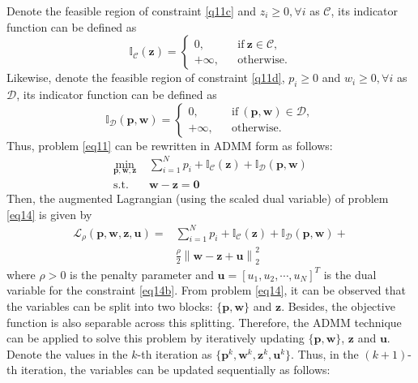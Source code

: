 \documentclass[journal]{IEEEtran}
\begin{document}
\begin{IEEEkeywords}
Denote the feasible region of constraint \eqref{q11c} and $z_i \geq 0, \forall i$ as $\mathcal{C}$, its indicator function can be defined as
\begin{equation}
\mathbb{I}_\mathcal{C}\left(\mathbf{z}\right) = \left\{ \begin{array}{lcl}
0, & &\mbox{if} \ \mathbf{z} \in \mathcal{C}, \\
+\infty, & &\mbox{otherwise}.
\end{array}
\right.
\end{equation}
Likewise, denote the feasible region of constraint \eqref{q11d}, $p_i\geq 0$ and $w_i \geq 0, \forall i$ as $\mathcal{D}$, its indicator function can be defined as
\begin{equation}
\mathbb{I}_\mathcal{D}\left(\mathbf{p},\mathbf{w}\right) = \left\{ \begin{array}{lcl}
0, & &\mbox{if} \ \left(\mathbf{p}, \mathbf{w}\right) \in \mathcal{D}, \\
+\infty, & &\mbox{otherwise}.
\end{array}
\right.
\end{equation}
Thus, problem \eqref{eq11} can be rewritten in ADMM form as follows:
\begin{subequations}\label{eq14}
	\begin{align}
	\min_{\mathbf{p}, \mathbf{w}, \mathbf{z}}\ & \sum\limits_{i = 1}^{N} p_i + \mathbb{I}_\mathcal{C}\left(\mathbf{z}\right) + \mathbb{I}_\mathcal{D}\left(\mathbf{p},\mathbf{w}\right)  \label{q14a} \\ \mbox{s.t.} \quad &  \mathbf{w} - \mathbf{z} = \mathbf{0} \label{q14b}
	\end{align}
\end{subequations}
Then, the augmented Lagrangian (using the scaled dual variable) of problem \eqref{eq14} is given by
\begin{align}
\mathcal{L}_\rho\left(\mathbf{p},\mathbf{w}, \mathbf{z},\mathbf{u}\right) = & \sum\limits_{i = 1}^{N} p_i + \mathbb{I}_\mathcal{C}\left(\mathbf{z}\right) + \mathbb{I}_\mathcal{D}\left(\mathbf{p},\mathbf{w}\right) +\nonumber \\ & \frac{\rho}{2}\left\|\mathbf{w} - \mathbf{z} + \mathbf{u}\right\|_2^2
\end{align}
where $\rho > 0$ is the penalty parameter and $\mathbf{u} = [u_1, u_2, \cdots, u_N]^T$ is the dual variable for the  constraint \eqref{eq14b}. From problem \eqref{eq14}, it can be observed that the variables can be split into two blocks: $\{\mathbf{p}, \mathbf{w}\}$ and $\mathbf{z}$. Besides, the objective function is also separable across this splitting. Therefore, the ADMM technique can be applied to solve this problem by iteratively updating $\{\mathbf{p}, \mathbf{w}\}$, $\mathbf{z}$ and $\mathbf{u}$. Denote the values in the $k$-th iteration as $\{\mathbf{p}^k, \mathbf{w}^k, \mathbf{z}^k, \mathbf{u}^k\}$. Thus, in the $(k+1)$-th iteration, the variables can be updated sequentially as follows:

\end{IEEEkeywords}
\end{document}
